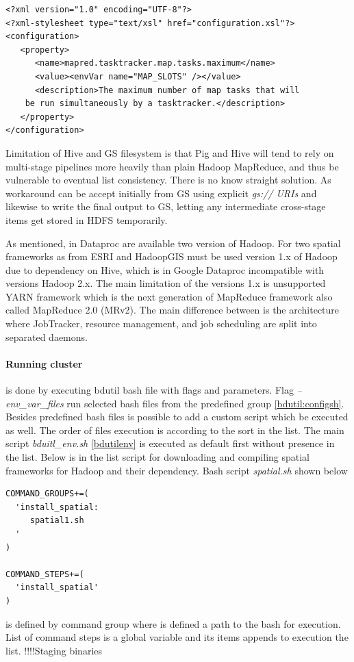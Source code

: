 \documentclass[a4paper,12pt,oneside]{report}
\begin{document}
\begin{footnotesize}
\begin{lstlisting}[style=XML]
<?xml version="1.0" encoding="UTF-8"?>
<?xml-stylesheet type="text/xsl" href="configuration.xsl"?>
<configuration>
   <property>
      <name>mapred.tasktracker.map.tasks.maximum</name>
      <value><envVar name="MAP_SLOTS" /></value>
      <description>The maximum number of map tasks that will 
    be run simultaneously by a tasktracker.</description>
   </property>
</configuration>
\end{lstlisting}
\end{footnotesize}

Limitation of Hive and GS filesystem is that Pig and Hive will tend to rely
on multi-stage pipelines more heavily than plain Hadoop MapReduce, and thus
be vulnerable to eventual list consistency. There is no know straight solution. As workaround can be accept initially from GS
using explicit \textit{gs:// URIs } and likewise to write the final output to GS,
letting any intermediate cross-stage items get stored in HDFS temporarily.


As mentioned, in Dataproc are available two version of Hadoop. For two spatial frameworks as from 
ESRI and HadoopGIS must be used version 1.x of Hadoop due to dependency on Hive, which is in Google 
Dataproc incompatible with versions Hadoop 2.x. The main limitation of the versions 1.x is unsupported 
YARN framework which is the next generation of MapReduce framework also called MapReduce 2.0 (MRv2)\cite{yarn}. 
The main difference between is the architecture where JobTracker, resource management, and job scheduling are split into separated daemons.




	

\paragraph{Running cluster}\label{runcluster}is done by executing bdutil bash file with flags and parameters.  
Flag \textit{--env\_var\_files} run selected bash files from the predefined group \ref{bdutil:configsh}. 
Besides predefined bash files is possible to add a custom script which be executed as well. The  order 
of files execution is according to the sort in the list. The main script \textit{bduitl\_env.sh} 
\ref{bdutilenv} is executed as default first without presence in the list. Below is in the list script 
for downloading and compiling spatial frameworks for Hadoop and their dependency. Bash script \textit{spatial.sh} shown below 
%
\begin{footnotesize}
\begin{lstlisting}[style=python]
COMMAND_GROUPS+=(
  'install_spatial:
     spatial1.sh
  '
)

COMMAND_STEPS+=(
  'install_spatial'
)
\end{lstlisting}
\end{footnotesize}
is defined by command group where is defined a path to the bash for execution. List of command steps is a
 global variable and its items appends to execution the list.
 !!!!Staging binaries
 
\end{document}
